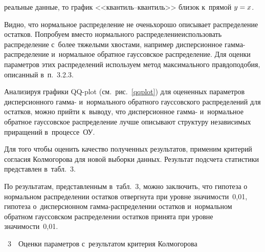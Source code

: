 \begin{multicols}{2}

\noindent
 реальные данные, то график <<кван\-тиль--кван\-тиль>> 
близок к~прямой $y \hm= x$.


        Видно, что нормальное распределение не очень\linebreak хорошо описывает 
распределение остатков. По\-пробуем вместо нормального распределение\linebreak использовать 
распределение с~более тяжелыми хвостами, например дисперсионное 
гам\-ма-рас\-пре\-де\-ле\-ние и~нормальное обратное гауссовское распределение. Для оценки 
параметров этих распределений используем метод максимального правдоподобия, 
описанный в~п.~3.2.3.

       

        Анализируя графики QQ-plot (см.\ рис.~\ref{qqplot}) для оцененных параметров 
дисперсионного гамма- и~нормального обратного гауссовского распределений для 
остатков, можно прийти к~выводу, что дисперсионное гамма- и~нормальное обратное 
гауссовское распределение лучше описывают структуру независимых приращений 
в~процессе~ОУ.

        Для того чтобы оценить качество полученных результатов, применим критерий 
согласия Колмогорова для новой выборки данных. Результат подсчета статистики 
представлен в~табл.~3.



        По результатам, представленным в~табл.~3, \mbox{можно} заключить, 
что гипотеза о нормальном рас\-пре\-делении остатков отвергнута при уровне 
зна\-чи\-мости~0,01, гипотеза о~дисперсионном гам\-ма-рас\-пре\-де\-ле\-нии остатков 
и~нормальном обратном гауссовском распределении остатков принята при уровне 
значимости~0,01.

\vspace*{12pt}

\noindent
{{\tablename~3}\ \ \small{Оценки параметров с~результатом критерия Колмогорова}}

\vspace*{1pt}


\end{multicols}
